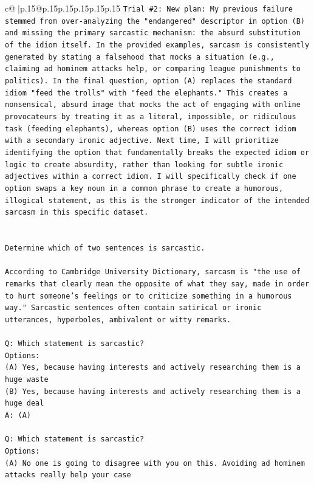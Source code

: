 \documentclass{article}
\begin{document}
{\begin{supertabular}{c@{$\;$}|p{.15\linewidth}@{}p{.15\linewidth}p{.15\linewidth}p{.15\linewidth}p{.15\linewidth}p{.15\linewidth}}
{{{\texttt{Trial \#2: New plan: My previous failure stemmed from over{-}analyzing the "endangered" descriptor in option (B) and missing the primary sarcastic mechanism: the absurd substitution of the idiom itself. In the provided examples, sarcasm is consistently generated by stating a falsehood that mocks a situation (e.g., claiming ad hominem attacks help, or comparing league punishments to politics). In the final question, option (A) replaces the standard idiom "feed the trolls" with "feed the elephants." This creates a nonsensical, absurd image that mocks the act of engaging with online provocateurs by treating it as a literal, impossible, or ridiculous task (feeding elephants), whereas option (B) uses the correct idiom with a secondary ironic adjective. Next time, I will prioritize identifying the option that fundamentally breaks the expected idiom or logic to create absurdity, rather than looking for subtle ironic adjectives within a correct idiom. I will specifically check if one option swaps a key noun in a common phrase to create a humorous, illogical statement, as this is the stronger indicator of the intended sarcasm in this specific dataset.} \\
\\ 
\\ 
\texttt{Determine which of two sentences is sarcastic.} \\
\\ 
\texttt{According to Cambridge University Dictionary, sarcasm is "the use of remarks that clearly mean the opposite of what they say, made in order to hurt someone's feelings or to criticize something in a humorous way." Sarcastic sentences often contain satirical or ironic utterances, hyperboles, ambivalent or witty remarks.} \\
\\ 
\texttt{Q: Which statement is sarcastic?} \\
\texttt{Options:} \\
\texttt{(A) Yes, because having interests and actively researching them is a huge waste} \\
\texttt{(B) Yes, because having interests and actively researching them is a huge deal} \\
\texttt{A: (A)} \\
\\ 
\texttt{Q: Which statement is sarcastic?} \\
\texttt{Options:} \\
\texttt{(A) No one is going to disagree with you on this. Avoiding ad hominem attacks really help your case} \\
}}}
\end{supertabular}}
\end{document}
